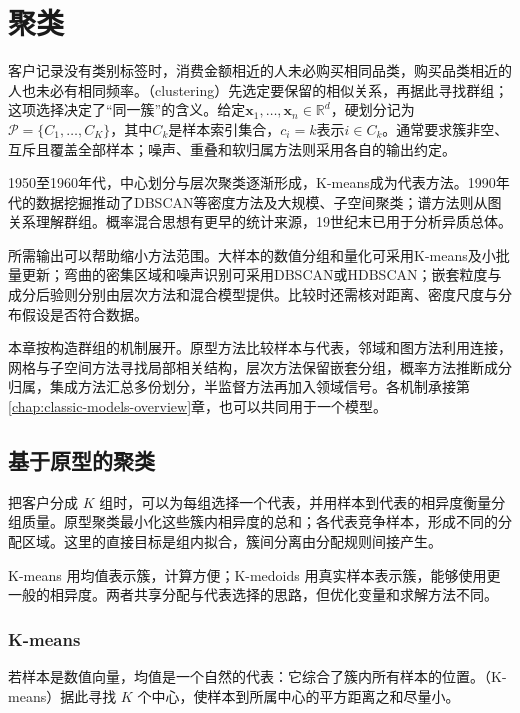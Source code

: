 \chapter{聚类}
\label{chap:clustering}

客户记录没有类别标签时，消费金额相近的人未必购买相同品类，购买品类相近的人也未必有相同频率。（clustering）先选定要保留的相似关系，再据此寻找群组；这项选择决定了“同一簇”的含义。给定$\bm{x}_1,\ldots,\bm{x}_n\in\mathbb{R}^{d}$，硬划分记为$\mathcal{P}=\{C_1,\ldots,C_K\}$，其中$C_k$是样本索引集合，$c_i=k$表示$i\in C_k$。通常要求簇非空、互斥且覆盖全部样本；噪声、重叠和软归属方法则采用各自的输出约定。

1950至1960年代，中心划分与层次聚类逐渐形成，K-means成为代表方法。1990年代的数据挖掘推动了DBSCAN等密度方法及大规模、子空间聚类；谱方法则从图关系理解群组。概率混合思想有更早的统计来源，19世纪末已用于分析异质总体。

所需输出可以帮助缩小方法范围。大样本的数值分组和量化可采用K-means及小批量更新；弯曲的密集区域和噪声识别可采用DBSCAN或HDBSCAN；嵌套粒度与成分后验则分别由层次方法和混合模型提供。比较时还需核对距离、密度尺度与分布假设是否符合数据。

本章按构造群组的机制展开。原型方法比较样本与代表，邻域和图方法利用连接，网格与子空间方法寻找局部相关结构，层次方法保留嵌套分组，概率方法推断成分归属，集成方法汇总多份划分，半监督方法再加入领域信号。各机制承接第\ref{chap:classic-models-overview}章，也可以共同用于一个模型。

\section{基于原型的聚类}
\label{sec:clustering-partition}

把客户分成 $K$ 组时，可以为每组选择一个代表，并用样本到代表的相异度衡量分组质量。原型聚类最小化这些簇内相异度的总和；各代表竞争样本，形成不同的分配区域。这里的直接目标是组内拟合，簇间分离由分配规则间接产生。

K-means 用均值表示簇，计算方便；K-medoids 用真实样本表示簇，能够使用更一般的相异度。两者共享分配与代表选择的思路，但优化变量和求解方法不同。

\subsection{K-means}
\label{sec:clustering-kmeans}

若样本是数值向量，均值是一个自然的代表：它综合了簇内所有样本的位置。（K-means）据此寻找 $K$ 个中心，使样本到所属中心的平方距离之和尽量小。

